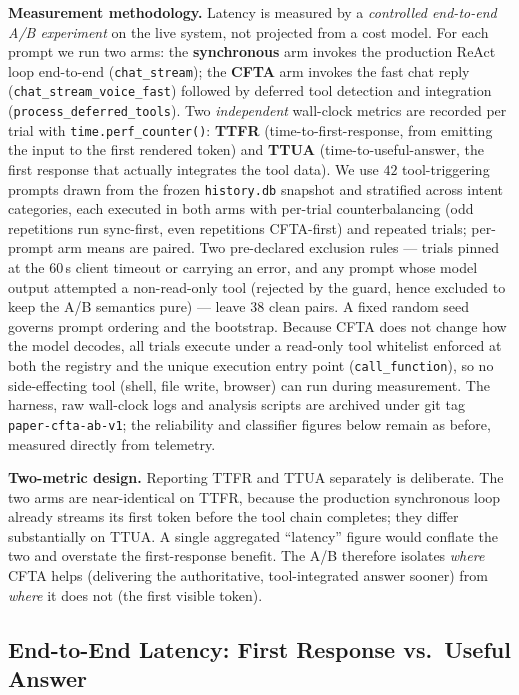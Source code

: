\documentclass[numbered,mediumone,traditional]{oup-authoring-template}
\begin{document}
\textbf{Measurement methodology.} Latency is measured by a \emph{controlled end-to-end A/B experiment} on the live system, not projected from a cost model. For each prompt we run two arms: the \textbf{synchronous} arm invokes the production ReAct loop end-to-end (\texttt{chat\_stream}); the \textbf{CFTA} arm invokes the fast chat reply (\texttt{chat\_stream\_voice\_fast}) followed by deferred tool detection and integration (\texttt{process\_deferred\_tools}). Two \emph{independent} wall-clock metrics are recorded per trial with \texttt{time.perf\_counter()}: \textbf{TTFR} (time-to-first-response, from emitting the input to the first rendered token) and \textbf{TTUA} (time-to-useful-answer, the first response that actually integrates the tool data). We use $42$ tool-triggering prompts drawn from the frozen \texttt{history.db} snapshot and stratified across intent categories, each executed in both arms with per-trial counterbalancing (odd repetitions run sync-first, even repetitions CFTA-first) and repeated trials; per-prompt arm means are paired. Two pre-declared exclusion rules --- trials pinned at the $60$\,s client timeout or carrying an error, and any prompt whose model output attempted a non-read-only tool (rejected by the guard, hence excluded to keep the A/B semantics pure) --- leave $38$ clean pairs. A fixed random seed governs prompt ordering and the bootstrap. Because CFTA does not change how the model decodes, all trials execute under a read-only tool whitelist enforced at both the registry and the unique execution entry point (\texttt{call\_function}), so no side-effecting tool (shell, file write, browser) can run during measurement. The harness, raw wall-clock logs and analysis scripts are archived under git tag \texttt{paper-cfta-ab-v1}; the reliability and classifier figures below remain as before, measured directly from telemetry.

\textbf{Two-metric design.} Reporting TTFR and TTUA separately is deliberate. The two arms are near-identical on TTFR, because the production synchronous loop already streams its first token before the tool chain completes; they differ substantially on TTUA. A single aggregated ``latency'' figure would conflate the two and overstate the first-response benefit. The A/B therefore isolates \emph{where} CFTA helps (delivering the authoritative, tool-integrated answer sooner) from \emph{where} it does not (the first visible token).

\subsection{End-to-End Latency: First Response vs.\ Useful Answer}
\end{document}

